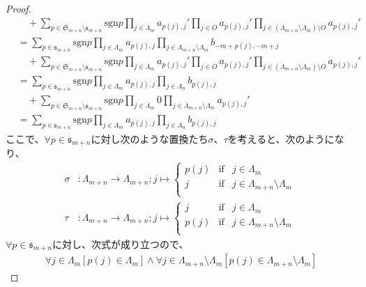 \documentclass[dvipdfmx]{jsarticle}
\begin{document}
\begin{proof}
\begin{align*}
&\quad + \sum_{p \in \mathfrak{S}_{m + n} \setminus \mathfrak{s}_{m + n}} {{\mathrm{sgn} }p\prod_{j \in \varLambda_{m}} a_{p(j),j}'\prod_{j \in O} a_{p(j),j}'\prod_{j \in \left( \varLambda_{m + n} \setminus \varLambda_{m} \right) \setminus O} a_{p(j),j}'}\\
&= \sum_{p \in \mathfrak{s}_{m + n}} {{\mathrm{sgn} }p\prod_{j \in \varLambda_{m}} a_{p(j),j}\prod_{j \in \varLambda_{m + n} \setminus \varLambda_{m}} b_{- m + p(j), - m + j}} \\
&\quad + \sum_{p \in \mathfrak{S}_{m + n} \setminus \mathfrak{s}_{m + n}} {{\mathrm{sgn} }p\prod_{j \in \varLambda_{m}} a_{p(j),j}'\prod_{j \in O} a_{p(j),j}'\prod_{j \in \left( \varLambda_{m + n} \setminus \varLambda_{m} \right) \setminus O} a_{p(j),j}'}\\
&= \sum_{p \in \mathfrak{s}_{m + n}} {{\mathrm{sgn} }p\prod_{j \in \varLambda_{m}} a_{p(j),j}\prod_{j \in \varLambda_{n}} b_{p(j),j}} \\
&\quad + \sum_{p \in \mathfrak{S}_{m + n} \setminus \mathfrak{s}_{m + n}} {{\mathrm{sgn} }p\prod_{j \in \varLambda_{m}} 0\prod_{j \in \varLambda_{m + n} \setminus \varLambda_{m}} a_{p(j),j}'}\\
&= \sum_{p \in \mathfrak{s}_{m + n}} {{\mathrm{sgn} }p\prod_{j \in \varLambda_{m}} a_{p(j),j}\prod_{j \in \varLambda_{n}} b_{p(j),j}}
\end{align*}
ここで、$\forall p \in \mathfrak{s}_{m + n}$に対し次のような置換たち$\sigma$、$\tau$を考えると、次のようになり、
\begin{align*}
\sigma&:\varLambda_{m + n} \rightarrow \varLambda_{m + n};j \mapsto \left\{ \begin{matrix}
p(j) & \mathrm{if} & j \in \varLambda_{m} \\
j & \mathrm{if} & j \in \varLambda_{m + n} \setminus \varLambda_{m} \\
\end{matrix} \right.\ \\
\tau&:\varLambda_{m + n} \rightarrow \varLambda_{m + n};j \mapsto \left\{ \begin{matrix}
j & \mathrm{if} & j \in \varLambda_{m} \\
p(j) & \mathrm{if} & j \in \varLambda_{m + n} \setminus \varLambda_{m} \\
\end{matrix} \right.\ 
\end{align*}
$\forall p \in \mathfrak{s}_{m + n}$に対し、次式が成り立つので、
\begin{align*}
\forall j \in \varLambda_{m}\left[ p(j) \in \varLambda_{m} \right] \land \forall j \in \varLambda_{m + n} \setminus \varLambda_{m}\left[ p(j) \in \varLambda_{m + n} \setminus \varLambda_{m} \right]

\end{align*}
\end{proof}
\end{document}
